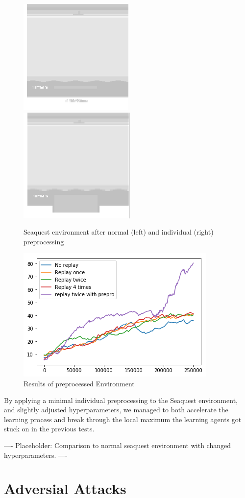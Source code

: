 \begin{figure}[h]
\includegraphics[scale=1]{bilder/seaquestgamenopre.png}
\includegraphics[scale=1]{bilder/seaquestgameprepro.png}
\caption{Seaquest environment after normal (left) and individual (right) preprocessing}
\end{figure}

\begin{figure}[h]
\includegraphics[scale=0.8]{bilder/seaquestprepro}
\caption{Results of preprocessed Environment}
\end{figure}

By applying a minimal individual preprocessing to the Seaquest environment, and slightly adjusted hyperparameters, we managed to both accelerate the learning process and break through the local maximum the learning agents got stuck on in the previous tests.

---- Placeholder: Comparison to normal seaquest environment with changed hyperparameters. ----
\section{Adversial Attacks}

